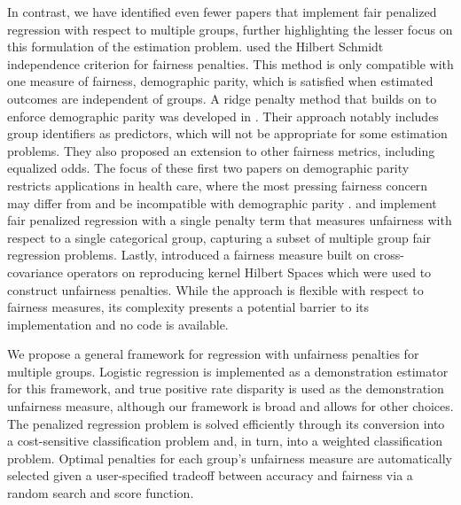 \documentclass[
  12pt]{article}
\begin{document}
In contrast, we have identified even fewer papers that implement fair
penalized regression with respect to multiple groups, further
highlighting the lesser focus on this formulation of the estimation
problem. \citet{perez-suay_fair_2017} used the Hilbert Schmidt
independence criterion for fairness penalties. This method is only
compatible with one measure of fairness, demographic parity, which is
satisfied when estimated outcomes are independent of groups. A ridge
penalty method that builds on \citet{komiyama_nonconvex_2018} to enforce
demographic parity was developed in \citet{scutari_achieving_2022}.
Their approach notably includes group identifiers as predictors, which
will not be appropriate for some estimation problems. They also proposed
an extension to other fairness metrics, including equalized odds. The
focus of these first two papers on demographic parity restricts
applications in health care, where the most pressing fairness concern
may differ from and be incompatible with demographic parity
\citep{seyyed-kalantari_underdiagnosis_2021, chen_algorithmic_2023}.
\citet{pfohl_empirical_2021} and \citet{pfohl_net_2022} implement fair
penalized regression with a single penalty term that measures unfairness
with respect to a single categorical group, capturing a subset of
multiple group fair regression problems. Lastly,
\citet{liu_practical_2022} introduced a fairness measure built on
cross-covariance operators on reproducing kernel Hilbert Spaces which
were used to construct unfairness penalties. While the approach is
flexible with respect to fairness measures, its complexity presents a
potential barrier to its implementation and no code is available.

We propose a general framework for regression with unfairness penalties
for multiple groups. Logistic regression is implemented as a
demonstration estimator for this framework, and true positive rate
disparity is used as the demonstration unfairness measure, although our
framework is broad and allows for other choices. The penalized
regression problem is solved efficiently through its conversion into a
cost-sensitive classification problem and, in turn, into a weighted
classification problem. Optimal penalties for each group's unfairness
measure are automatically selected given a user-specified tradeoff
between accuracy and fairness via a random search and score function.
\end{document}
